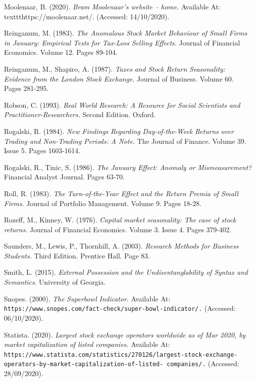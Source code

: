 \documentclass[11pt, english]{article}
\begin{document}
\begin{thebibliography}{9}
		Moolenaar, B. (2020).
		\textsl{Bram Moolenaar’s website – home.}
		Available At:
		texttt{https://moolenaar.net/.}
		(Accessed: 14/10/2020).


		Reinganum, M. (1983).
		\textsl{The Anomalous Stock Market Behaviour of Small Firms in January: Empirical Tests for Tax-Loss Selling Effects.}
		Journal of Financial Economics. Volume 12. Pages 89-104.

		Reinganum, M., Shapiro, A. (1987).
		\textsl{Taxes and Stock Return Seasonality: Evidence from the London Stock Exchange.}
		Journal of Business. Volume 60. Pages 281-295.

		Robson, C. (1993).
		\textsl{Real World Research: A Resource for Social Scientists
 and Practitioner-Researchers.}
		Second Edition. Oxford.

		Rogalski, R. (1984).
		\textsl{New Findings Regarding Day-of-the-Week Returns over Trading and Non-Trading Periods: A Note.}
		The Journal of Finance. Volume 39. Issue 5. Pages 1603-1614.

		Rogalski, R., Tinic, S. (1986).
		\textsl{The January Effect: Anomaly or Mismeasurement?}
		Financial Analyst Journal. Pages 63-70.

		Roll, R. (1983).
		\textsl{The Turn-of-the-Year Effect and the Return Premia of Small Firms.}
		Journal of Portfolio Management. Volume 9. Pages 18-28.

		Rozeff, M., Kinney, W. (1976).
		\textsl{Capital market seasonality: The case of stock returns.}
		Journal of Financial Economics. Volume 3. Issue 4. Pages 379-402.


		Saunders, M., Lewis, P., Thornhill, A. (2003).
		\textsl{Research Methods for Business Students.}
		Third Edition. Prentice Hall. Page 83.

		Smith, L. (2015).
		\textsl{External Possession and the Undisentanglability of Syntax and Semantics.}
		University of Georgia.

		Snopes. (2000).
		\textsl{The Superbowl Indicator.}
		Available At:
		\texttt{https://www.snopes.com/fact-check/super-bowl-indicator/.}
		(Accessed: 06/10/2020).

		Statista. (2020).
		\textsl{Largest stock exchange operators worldwide as of Mar 2020, by market capitalization of listed companies.}
		Available At:
		\texttt{https://www.statista.com/statistics/270126/largest-stock-exchange- operators-by-market-capitalization-of-listed- companies/.}
		(Accessed: 28/09/2020).


\end{thebibliography}
\end{document}
